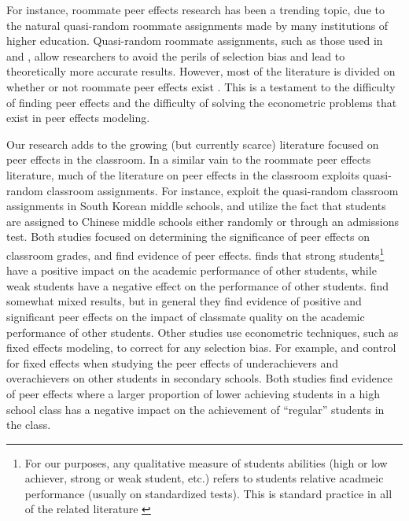 \documentclass[12pt,a4paper,english,fleqn]{article}
\begin{document}
For instance, roommate peer effects research has been a trending topic, due to the natural quasi-random roommate assignments made by many institutions of higher education.
Quasi-random roommate assignments, such as those used in \citet{griffith2014peer} and \citet{zimmerman2003peer}, allow researchers to avoid the perils of selection bias and lead to theoretically more accurate results.
However, most of the literature is divided on whether or not roommate peer effects exist \citep{griffith2014peer,zimmerman2003peer,sacerdote2000peer,foster2006s,mcewan2006roommate}.
This is a testament to the difficulty of finding peer effects and the difficulty of solving the econometric problems that exist in peer effects modeling.

Our research adds to the growing (but currently scarce) literature focused on peer effects in the classroom.
In a similar vain to the roommate peer effects literature, much of the literature on peer effects in the classroom exploits quasi-random classroom assignments.
For instance, \citet{kang2007classroom} exploit the quasi-random classroom assignments in South Korean middle schools, and \citet{carman2012classroom} utilize the fact that students are assigned to Chinese middle schools either randomly or through an admissions test.
Both studies focused on determining the significance of peer effects on classroom grades, and find evidence of peer effects.
\citeauthor{kang2007classroom} finds that strong students\footnote{For our purposes, any qualitative measure of students abilities (high or low achiever, strong or weak student, etc.) refers to students relative acadmeic performance (usually on standardized tests). This is standard practice in all of the related literature \citep{carman2012classroom,burke2013classroom,kang2007classroom,schlosser2008inside,lavy2012good}} have a positive impact on the academic performance of other students, while weak students have a negative effect on the performance of other students. 
\citeauthor{carman2012classroom} find somewhat mixed results, but in general they find evidence of positive and significant peer effects on the impact of classmate quality on the academic performance of other students.
Other studies use econometric techniques, such as fixed effects modeling, to correct for any selection bias.
For example, \citet{schlosser2008inside} and \citet{lavy2012good} control for fixed effects when studying the peer effects of underachievers and overachievers on other students in secondary schools.
Both studies find evidence of peer effects where a larger proportion of lower achieving students in a high school class has a negative impact on the achievement of ``regular'' students in the class.
\end{document}
